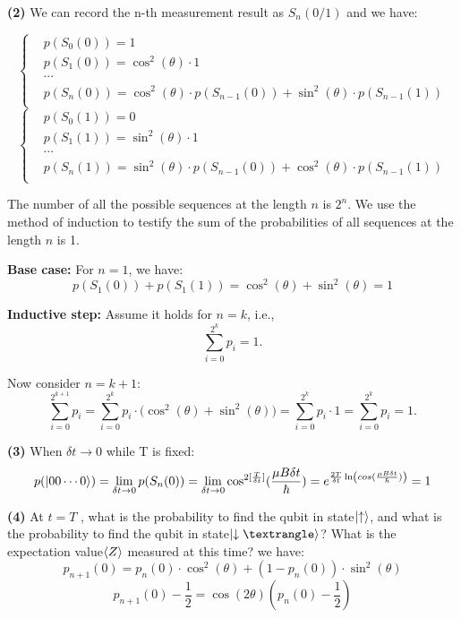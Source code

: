 \documentclass[12pt]{article}
\begin{document}
\textbf{(2)} 
We can record the n-th measurement result as $S_{n}(0/1)$ and we have:

\[
\left\{
\begin{aligned}
    &p(S_{0}(0)) = 1 \\
    &p(S_{1}(0)) = \cos^2(\theta) \cdot 1 \\
    &\cdots \\
    &p(S_{n}(0)) = \cos^2(\theta) \cdot p(S_{n-1}(0)) + \sin^2(\theta) \cdot p(S_{n-1}(1)) \\
\end{aligned}
\right.
\]
\[
\left\{
\begin{aligned}
    &p(S_{0}(1)) = 0 \\
    &p(S_{1}(1)) = \sin^2(\theta) \cdot 1 \\
    &\cdots \\
    &p(S_{n}(1)) = \sin^2(\theta) \cdot p(S_{n-1}(0))+ \cos^2(\theta) \cdot p(S_{n-1}(1)) \\
\end{aligned}
\right.
\]

The number of all the possible sequences at the length $n$ is $2^n$. We use the method of induction to testify the sum of the probabilities of all sequences at the length $n$ is 1.

\textbf{Base case:} For $n=1$, we have:
\[
p(S_{1}(0)) + p(S_{1}(1)) = \cos^2(\theta) + \sin^2(\theta) = 1
\]

\textbf{Inductive step:} Assume it holds for $n=k$, i.e.,
\[
\sum_{i=0}^{2^k} p_i = 1.
\]

Now consider $n = k+1$:
\[
\sum_{i=0}^{2^{k+1}} p_i
= \sum_{i=0}^{2^k} p_i \cdot \bigl(\cos^2(\theta) + \sin^2(\theta)\bigr)
= \sum_{i=0}^{2^k} p_i \cdot 1
= \sum_{i=0}^{2^k} p_i
= 1.
\]

\textbf{(3)} When $\delta t\to 0$ while T is fixed:
\[
p(\ket{00\cdots 0}) = \lim_{\delta t \to 0} p(S_{n}(0)) = \lim_{\delta t \to 0} \cos^{2[\frac{T}{\delta t}]}(\frac{\mu B \delta t}{\hbar}) = e^{\frac{2T}{\delta t}\ln(cos(\frac{\mu B \delta t}{\hbar}))}=1
\]

\textbf{(4)}  At $t = T$ , what is the probability to find the qubit in state$\ket{\uparrow}$, and what is the probability to find the qubit in state$\ket{ \downarrow⟩}$? What is the expectation value$ \braket{Z}$ measured at this time? 
we have:
\[
p_{n+1}(0)=p_{n}(0)\cdot\cos^2(\theta)+(1-p_{n}(0))\cdot \sin^2(\theta) 
\]
\[
p_{n+1}(0)-\frac{1}{2}=\cos(2\theta)(p_{n}(0)-\frac{1}{2})
\]
\end{document}
